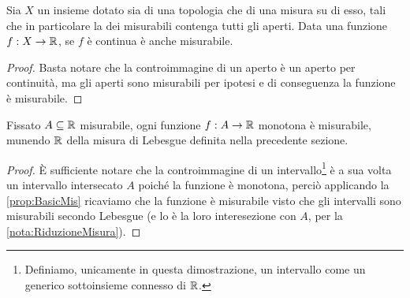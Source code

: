 \begin{remark}\label{nota:ContinueMisurabili}
	Sia $X$ un insieme dotato sia di una topologia che di una misura su di esso, tali che in particolare la \sigalg{} dei misurabili contenga tutti gli aperti.
	Data una funzione $f:X\to\mathbb R$, se $f$ è continua è anche misurabile.
\end{remark}
\begin{proof}
	Basta notare che la controimmagine di un aperto è un aperto per continuità, ma gli aperti sono misurabili per ipotesi e di conseguenza la funzione è misurabile.
\end{proof}

\begin{remark}\label{nota:MonotoneMisurabili}
	Fissato $A\subseteq \mathbb R$ misurabile, ogni funzione $f:A\to\mathbb R$ monotona è misurabile, munendo $\mathbb R$ della misura di Lebesgue definita nella precedente sezione.
\end{remark}
\begin{proof}
	È sufficiente notare che la controimmagine di un intervallo\footnote{Definiamo, unicamente in questa dimostrazione, un intervallo come un generico sottoinsieme connesso di $\mathbb R$.} è a sua volta un intervallo intersecato $A$ poiché la funzione è monotona, perciò applicando la \cref{prop:BasicMis} ricaviamo che la funzione è misurabile visto che gli intervalli sono misurabili secondo Lebesgue (e lo è la loro interesezione con $A$, per la \cref{nota:RiduzioneMisura}).
\end{proof}

